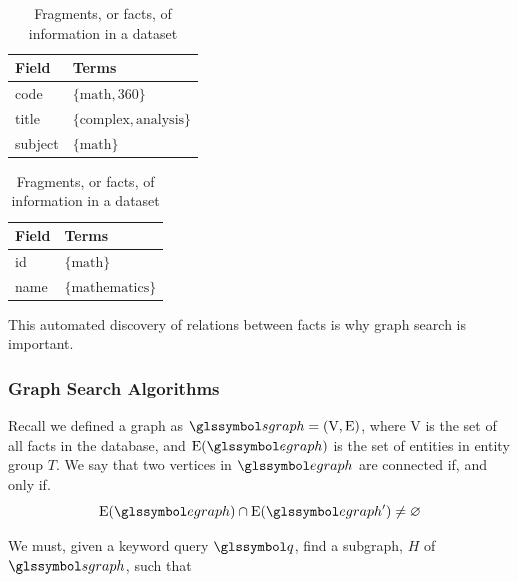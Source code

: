			\begin{table}
				\begin{subtable}[b]{0.5\linewidth}
					\centering
					
					\begin{tabular}{ll}
						\toprule
						Field & Terms \\
						\midrule
						code & \(\{\text{math}, \text{360}\}\) \\
						title & \(\{\text{complex}, \text{analysis}\}\) \\
						subject & \(\{\text{math}\}\) \\
						\bottomrule
					\end{tabular}
					
					\caption{Fact representing a Course}
					\label{subtbl:fact-course}
				\end{subtable}
				\begin{subtable}[b]{0.5\linewidth}
					\centering
					
					\begin{tabular}{ll}
						\toprule
						Field & Terms \\
						\midrule
						id & \(\{\text{math}\}\) \\
						name & \(\{\text{mathematics}\}\) \\
						\bottomrule
					\end{tabular}
					
					\caption{Fact representing a Subject}
					\label{subtbl:fact-subject}
				\end{subtable}
				
				\caption{Fragments, or facts, of information in a dataset}
				\label{tbl:facts}
			\end{table}
			
			This automated discovery of relations between facts is why graph search is important.
		
		\subsubsection{Graph Search Algorithms}
			Recall we defined a graph as \(\sgraph{} = (\text{V}, \text{E})\), where \(\text{V}\) is the set of all facts in the database, and \(\text{E}(\egraph{})\) is the set of entities in entity group \(T\).  We say that two vertices in \(\egraph{}\) are connected if, and only if.
			\[
				\text{E}(\egraph{}) \cap \text{E}(\egraph{}') \not= \emptyset
			\]
			
			We must, given a keyword query \(\q\), find a subgraph, \(H\) of \(\sgraph{}\), such that
			
